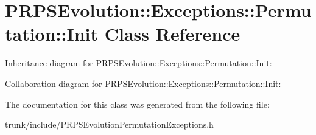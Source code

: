 \hypertarget{class_p_r_p_s_evolution_1_1_exceptions_1_1_permutation_1_1_init}{\section{P\-R\-P\-S\-Evolution\-:\-:Exceptions\-:\-:Permutation\-:\-:Init Class Reference}
\label{class_p_r_p_s_evolution_1_1_exceptions_1_1_permutation_1_1_init}
}


Inheritance diagram for P\-R\-P\-S\-Evolution\-:\-:Exceptions\-:\-:Permutation\-:\-:Init\-:


Collaboration diagram for P\-R\-P\-S\-Evolution\-:\-:Exceptions\-:\-:Permutation\-:\-:Init\-:


The documentation for this class was generated from the following file\-:\begin{DoxyCompactItemize}
\item 
trunk/include/P\-R\-P\-S\-Evolution\-Permutation\-Exceptions.\-h\end{DoxyCompactItemize}
